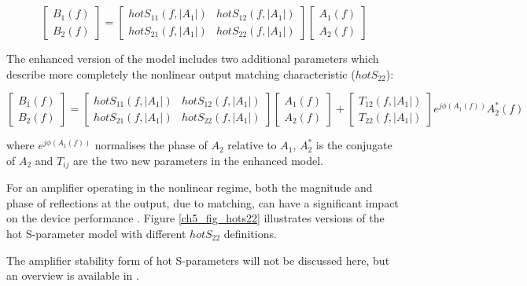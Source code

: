 \documentclass[../thesis/thesis.tex]{subfiles}
\begin{document}
\begin{equation}
	\begin{bmatrix}
		B_1(f) \\ 
		B_2(f) 
	\end{bmatrix}
	= 
	\begin{bmatrix}
		hotS_{11}(f, |A_1|) & hotS_{12}(f, |A_1|) \\
		hotS_{21}(f, |A_1|) & hotS_{22}(f, |A_1|)
	\end{bmatrix}
	\begin{bmatrix}
	A_1(f) \\ 
	A_2(f) 
	\end{bmatrix}
\end{equation}

The enhanced version of the model includes two additional parameters which describe more completely the nonlinear output matching characteristic ($hotS_{22}$):

\begin{equation}
	\begin{bmatrix}
		B_1(f) \\ 
		B_2(f) 
	\end{bmatrix}
	= 
	\begin{bmatrix}
		hotS_{11}(f, |A_1|) & hotS_{12}(f, |A_1|) \\
		hotS_{21}(f, |A_1|) & hotS_{22}(f, |A_1|)
	\end{bmatrix}
	\begin{bmatrix}
		A_1(f) \\ 
		A_2(f) 
	\end{bmatrix}
	+
	\begin{bmatrix}
		T_{12}(f, |A_1|) \\ 
		T_{22}(f, |A_1|) 
	\end{bmatrix}
	e^{j\phi(A_1(f))}A_2^*(f)
	\label{ch5_eqn_hotsp}
\end{equation}

where $e^{j\phi(A_1(f))}$ normalises the phase of $A_2$ relative to $A_1$, $A_2^*$ is the conjugate of $A_2$ and $T_{ij}$ are the two new parameters in the enhanced model.

For an amplifier operating in the nonlinear regime, both the magnitude and phase of reflections at the output, due to matching, can have a significant impact on the device performance \cite[Figure 12.13]{Cripps_2006}. Figure \ref{ch5_fig_hots22} illustrates versions of the hot S-parameter model with different $hotS_{22}$ definitions.

The amplifier stability form of hot S-parameters will not be discussed here, but an overview is available in \cite{Verspecht_2005}.
\end{document}
